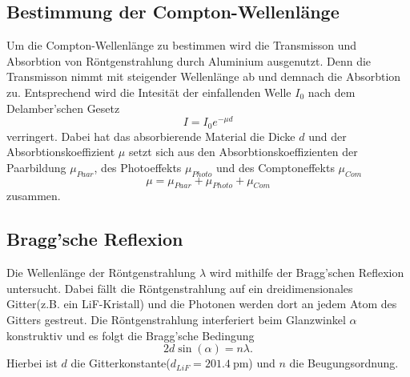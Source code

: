 \subsection{Bestimmung der Compton-Wellenlänge}
Um die Compton-Wellenlänge zu bestimmen wird die Transmisson und Absorbtion von Röntgenstrahlung durch Aluminium ausgenutzt.
Denn die Transmisson nimmt mit steigender Wellenlänge ab und demnach die Absorbtion zu. Entsprechend wird die Intesität der
einfallenden Welle $I_0$ nach dem Delamber'schen Gesetz
\begin{equation}
    I = I_0 e^{-\mu d}
\end{equation}
verringert. Dabei hat das absorbierende Material die Dicke $d$ und der Absorbtionskoeffizient $\mu$ setzt sich aus den Absorbtionskoeffizienten
der Paarbildung $\mu_{Paar}$, des Photoeffekts $\mu_{Photo}$ und des Comptoneffekts $\mu_{Com}$
\begin{equation*}
    \mu = \mu_{Paar} + \mu_{Photo} + \mu_{Com}
\end{equation*}
zusammen.
\subsection{Bragg'sche Reflexion}
Die Wellenlänge der Röntgenstrahlung $\lambda$ wird mithilfe der Bragg'schen Reflexion untersucht. Dabei fällt die Röntgenstrahlung auf ein dreidimensionales
Gitter(z.B. ein LiF-Kristall) und die Photonen werden dort an jedem Atom des Gitters gestreut. Die Röntgenstrahlung interferiert beim Glanzwinkel $\alpha$ konstruktiv
und es folgt die Bragg'sche Bedingung
\begin{equation}
    \label{eqn:Bragg}
    2d\sin\left(\alpha\right) = n\lambda.
\end{equation}
Hierbei ist $d$ die Gitterkonstante($d_{LiF} = \SI{201,4}{\pico\meter}$) und $n$ die Beugungsordnung.
